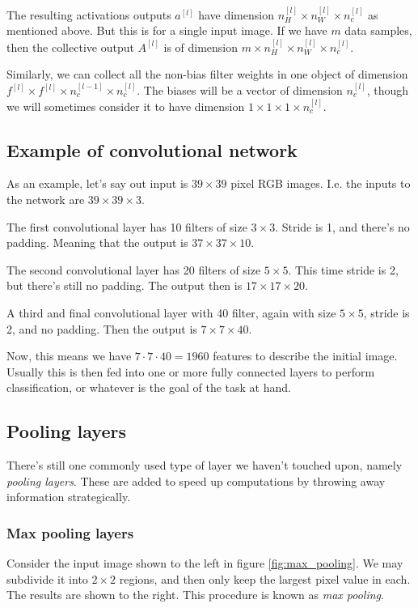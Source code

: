\documentclass[12pt, a4paper]{article}
\numberwithin{equation}{section}
\begin{document}
The resulting activations outputs $a^{[l]}$ have dimension $n_H^{[l]}\times n_W^{[l]}\times n_c^{[l]}$ as mentioned above. But this is for a single input image. If we have $m$ data samples, then the collective output $A^{[l]}$ is of dimension $m\times n_H^{[l]}\times n_W^{[l]}\times n_c^{[l]}$.

Similarly, we can collect all the non-bias filter weights in one object of dimension $f^{[l]}\times f^{[l]}\times n_c^{[l-1]}\times n_c^{[l]}$. The biases will be a vector of dimension $n_c^{[l]}$, though we will sometimes consider it to have dimension $1\times 1\times 1\times n_c^{[l]}$.

\subsection{Example of convolutional network}
As an example, let's say out input is $39\times 39$ pixel RGB images. I.e. the inputs to the network are $39\times 39\times 3$.

The first convolutional layer has 10 filters of size $3\times 3$. Stride is 1, and there's no padding. Meaning that the output is $37\times 37\times 10$.

The second convolutional layer has 20 filters of size $5\times 5$. This time stride is 2, but there's still no padding. The output then is $17\times 17\times 20$.

A third and final convolutional layer with 40 filter, again with size $5\times 5$, stride is 2, and no padding. Then the output is $7\times 7\times 40$.

Now, this means we have $7\cdot 7\cdot 40=1960$ features to describe the initial image. Usually this is then fed into one or more fully connected layers to perform classification, or whatever is the goal of the task at hand.

\subsection{Pooling layers}
There's still one commonly used type of layer we haven't touched upon, namely \textit{pooling layers}. These are added to speed up computations by throwing away information strategically.

\subsubsection{Max pooling layers}
Consider the input image shown to the left in figure \ref{fig:max_pooling}. We may subdivide it into $2\times 2$ regions, and then only keep the largest pixel value in each. The results are shown to the right. This procedure is known as \textit{max pooling}.
\end{document}

